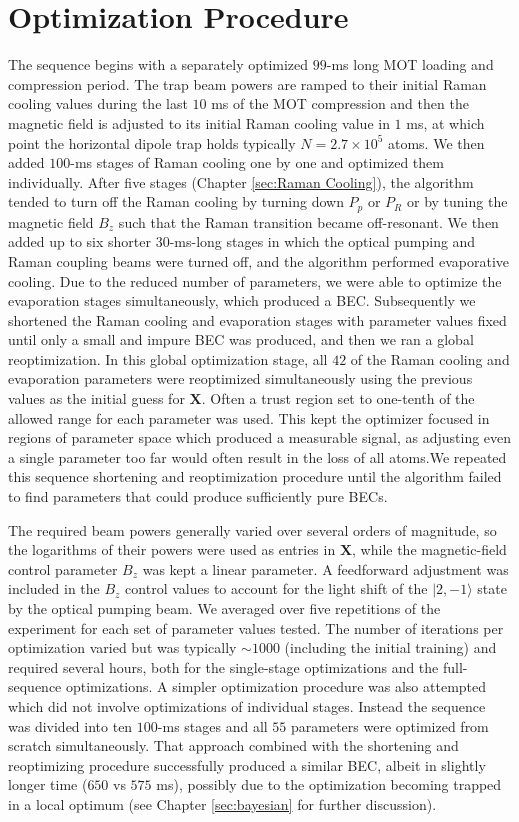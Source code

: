 \documentclass{article}
\begin{document}
\section{Optimization Procedure}
The sequence begins with a separately optimized $99$-ms long MOT loading and compression period. The trap beam powers are ramped to their initial Raman cooling values during the last $10$ ms of the MOT compression and then the magnetic field is adjusted to its initial Raman cooling value in $1$ ms, at which point the horizontal dipole trap holds typically $N = 2.7 \times 10^5$ atoms. We then added $100$-ms stages of Raman cooling one by one and optimized them individually. After five stages (Chapter \ref{sec:Raman Cooling}), the algorithm tended to turn off the Raman cooling by turning down $P_p$ or $P_R$ or by tuning the magnetic field $B_z$ such that the Raman transition became off-resonant. We then added up to six shorter $30$-ms-long stages in which the optical pumping and Raman coupling beams were turned off, and the algorithm performed evaporative cooling. Due to the reduced number of parameters, we were able to optimize the evaporation stages simultaneously, which produced a BEC. Subsequently we shortened the Raman cooling and evaporation stages with parameter values fixed until only a small and impure BEC was produced, and then we ran a global reoptimization. In this global optimization stage, all $42$ of the Raman cooling and evaporation parameters were reoptimized simultaneously using the previous values as the initial guess for $\mathbf{X}$. Often a trust region set to one-tenth of the allowed range for each parameter was used. This kept the optimizer focused in regions of parameter space which produced a measurable signal, as adjusting even a single parameter too far would often result in the loss of all atoms.We repeated this sequence shortening and reoptimization procedure until the algorithm failed to find parameters that could produce sufficiently pure BECs.

The required beam powers generally varied over several orders of magnitude, so the logarithms of their powers were used as entries in $\mathbf{X}$, while the magnetic-field control parameter $B_z$ was kept a linear parameter. A feedforward adjustment was included in the $B_z$ control values to account for the light shift of the $\vert 2,-1\rangle$ state by the optical pumping beam. We averaged over five repetitions of the experiment for each set of parameter values tested. The number of iterations per optimization varied but was typically $\sim 1000$ (including the initial training) and required several hours, both for the single-stage optimizations and the full-sequence optimizations. A simpler optimization procedure was also attempted which did not involve optimizations of individual stages. Instead the sequence was divided into ten $100$-ms stages and all $55$ parameters were optimized from scratch simultaneously. That approach combined with the shortening and reoptimizing procedure successfully produced a similar BEC, albeit in slightly longer time ($650$ vs $575$ ms), possibly due to the optimization becoming trapped in a local optimum (see Chapter \ref{sec:bayesian} for further discussion).
\end{document}
